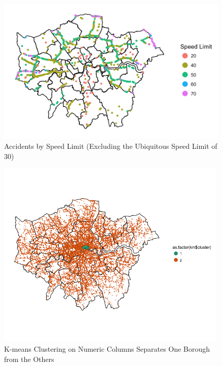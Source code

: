 \documentclass[a4paper, 11pt]{article}
\begin{document}
\begin{figure}[H]
    \begin{center}
      \includegraphics[height=7cm,keepaspectratio]{sl_london.png}
      \caption{Accidents by Speed Limit (Excluding the Ubiquitous Speed Limit of 30)}
    \end{center}
\end{figure}

\begin{figure}[H]
    \begin{center}
      \includegraphics[height=9cm,keepaspectratio]{km_1_county.png}
      \caption{K-means Clustering on Numeric Columns Separates One Borough from the Others}
    \end{center}
\end{figure}
\end{document}
